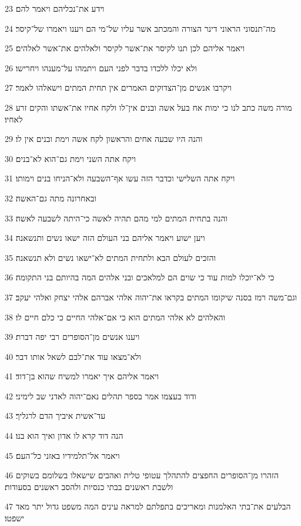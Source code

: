 \par 23 וידע את־נכליהם ויאמר להם׃
\par 24 מה־תנסוני הראוני דינר הצורה והמכתב אשר עליו של־מי הם ויענו ויאמרו של־קיסר׃
\par 25 ויאמר אליהם לכן תנו לקיסר את־אשר לקיסר ולאלהים את־אשר לאלהים׃
\par 26 ולא יכלו ללכדו בדבר לפני העם ויתמהו על־מענהו ויחרישו׃
\par 27 ויקרבו אנשים מן־הצדוקים האמרים אין תחית המתים וישאלהו לאמר׃
\par 28 מורה משה כתב לנו כי ימות אח בעל אשה ובנים אין־לו ולקח אחיו את־אשתו והקים זרע לאחיו׃
\par 29 והנה היו שבעה אחים והראשון לקח אשה וימת ובנים אין לו׃
\par 30 ויקח אתה השני וימת גם־הוא לא־בנים׃
\par 31 ויקח אתה השלישי וכדבר הזה עשו אף־השבעה ולא־הניחו בנים וימותו׃
\par 32 ובאחרונה מתה גם־האשה׃
\par 33 והנה בתחית המתים למי מהם תהיה לאשה כי־היתה לשבעה לאשה׃
\par 34 ויען ישוע ויאמר אליהם בני העולם הזה ישאו נשים ותנשאנה׃
\par 35 והזכים לעולם הבא ולתחית המתים לא־ישאו נשים ולא תנשאנה׃
\par 36 כי לא־יוכלו למות עוד כי שוים הם למלאכים ובני אלהים המה בהיותם בני התקומה׃
\par 37 וגם־משה רמז בסנה שיקומו המתים בקראו את־יהוה אלהי אברהם אלהי יצחק ואלהי יעקב׃
\par 38 והאלהים לא אלהי המתים הוא כי אם־אלהי החיים כי כלם חיים לו׃
\par 39 ויענו אנשים מן־הסופרים רבי יפה דברת׃
\par 40 ולא־מצאו עוד את־לבם לשאל אותו דבר׃
\par 41 ויאמר אליהם איך יאמרו למשיח שהוא בן־דוד׃
\par 42 ודוד בעצמו אמר בספר תהלים נאם־יהוה לאדני שב לימיני׃
\par 43 עד־אשית איביך הדם לרגליך׃
\par 44 הנה דוד קרא לו אדון ואיך הוא בנו׃
\par 45 ויאמר אל־תלמידיו באזני כל־העם׃
\par 46 הזהרו מן־הסופרים החפצים להתהלך עטופי טלית ואהבים שישאלו בשלומם בשוקים ולשבת ראשנים בבתי כנסיות ולהסב ראשנים בסעודות׃
\par 47 הבלעים את־בתי האלמנות ומאריכים בתפלתם למראה עינים המה משפט גדול יתר מאד ישפטו׃

